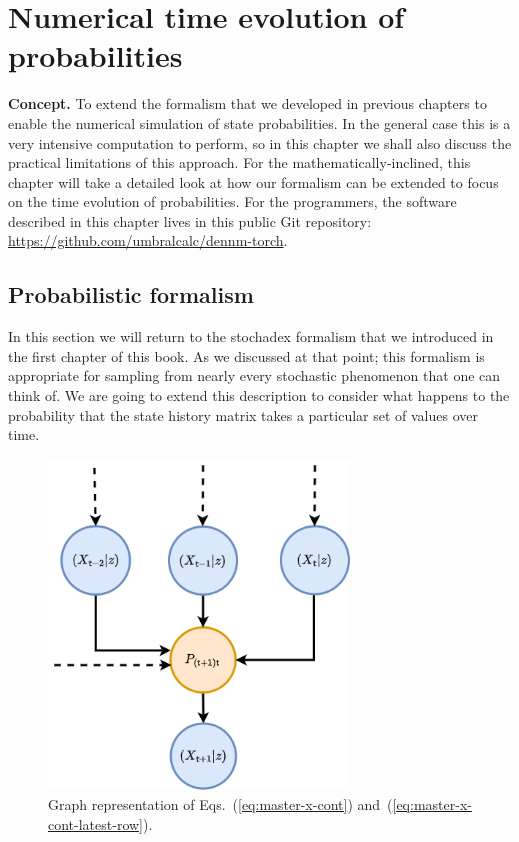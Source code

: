 \chapter{\sffamily Numerical time evolution of probabilities}

{\bfseries\sffamily Concept.} To extend the formalism that we developed in previous chapters to enable the numerical simulation of state probabilities. In the general case this is a very intensive computation to perform, so in this chapter we shall also discuss the practical limitations of this approach. For the mathematically-inclined, this chapter will take a detailed look at how our formalism can be extended to focus on the time evolution of probabilities. For the programmers, the software described in this chapter lives in this public Git repository: \href{https://github.com/umbralcalc/dennm-torch}{https://github.com/umbralcalc/dennm-torch}.

\section{\sffamily Probabilistic formalism}

In this section we will return to the stochadex formalism that we introduced in the first chapter of this book. As we discussed at that point; this formalism is appropriate for sampling from nearly every stochastic phenomenon that one can think of. We are going to extend this description to consider what happens to the probability that the state history matrix takes a particular set of values over time.

\begin{figure}[h]
\centering
\includegraphics[width=8cm]{images/chapter-3-master-eq-graph.drawio.png}
\caption{Graph representation of Eqs.~(\ref{eq:master-x-cont}) and~(\ref{eq:master-x-cont-latest-row}).}
\label{fig:master-eqn}
\end{figure} 

